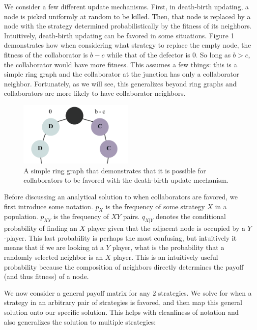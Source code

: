 \documentclass[11pt]{article}
\begin{document}
We consider a few different update mechanisms. First, in death-birth updating, a node is picked uniformly at random to be killed. Then, that node is replaced by a node with the strategy determined probabilistically by the fitness of its neighbors. Intuitively, death-birth updating can be favored in some situations. Figure 1 demonstrates how when considering what strategy to replace the empty node, the fitness of the collaborator is $b - c$ while that of the defector is $0$. So long as $b > c$, the collaborator would have more fitness. This assumes a few things: this is a simple ring graph and the collaborator at the junction has only a collaborator neighbor. Fortunately, as we will see, this generalizes beyond ring graphs and collaborators are more likely to have collaborator neighbors. 

\begin{figure}[htbp]
    \centering    \includegraphics[width=0.5\textwidth]{figures/death-birth.png}
    \caption{A simple ring graph that demonstrates that it is possible for collaborators to be favored with the death-birth update mechanism.}
    \label{fig:death-birth}
\end{figure}

Before discussing an analytical solution to when collaborators are favored, we first introduce some notation. $p_X$ is the frequency of some strategy $X$ in a population. $p_{XY}$ is the frequency of $XY$ pairs. $q_{X|Y}$ denotes the conditional probability of finding an $X$ player given that the adjacent node is occupied by a $Y$-player. This last probability is perhaps the most confusing, but intuitively it means that if we are looking at a $Y$ player, what is the probability that a randomly selected neighbor is an $X$ player. This is an intuitively useful probability because the composition of neighbors directly determines the payoff (and thus fitness) of a node. 

We now consider a general payoff matrix for any 2 strategies. We solve for when a strategy in an arbitrary pair of strategies is favored, and then map this general solution onto our specific solution. This helps with cleanliness of notation and also generalizes the solution to multiple strategies:
\end{document}
